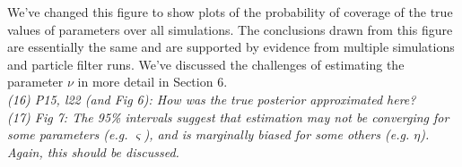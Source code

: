 \documentclass{article}
\begin{document}
We've changed this figure to show plots of the probability of coverage of the true values of parameters over all simulations. The conclusions drawn from this figure are essentially the same and are supported by evidence from multiple simulations and particle filter runs. We've discussed the challenges of estimating the parameter $\nu$ in more detail in Section 6. \\

\noindent \emph{(16) P15, l22 (and Fig 6): How was the true posterior approximated here?} \\

\noindent \emph{(17) Fig 7: The 95\% intervals suggest that estimation may not be converging for some parameters (e.g. $\varsigma$), and is marginally biased for some others (e.g. $\eta$). Again, this should be discussed.} \\
\end{document}
